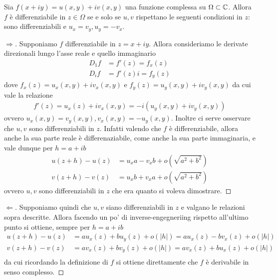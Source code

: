 \begin{theorem}
	Sia $f(x+iy) = u(x,y) + iv(x,y)$ una funzione complessa su $\Omega \subset \mathbb{C}$. Allora $f$ è differenziabile in $z \in \Omega$ se e solo se $u,v$ rispettano le seguenti condizioni in $z$: sono differenziabili e $u_x = v_y, u_y = - v_x$.
\end{theorem}
\begin{proof}[$\Rightarrow$]
	Supponiamo $f$ differenziabile in $z=x+iy$. Allora consideriamo le derivate direzionali lungo l'asse reale e quello immaginario
	\begin{equation}
	\begin{aligned}
		D_{1} f & = f'(z) = f_x(z) \\
		D_{i} f & = f'(z)i = f_y(z)
	\end{aligned}
	\end{equation}
	dove $f_x(z) = u_x(x,y) + iv_x(x,y)$ e $f_y(z) = u_y(x,y) + iv_y(x,y)$ da cui vale la relazione 
	\begin{equation}
	\begin{aligned}
		f'(z) = u_x(z) + iv_x(x,y) = -i(u_y(x,y) + iv_y(x,y))
	\end{aligned}
	\end{equation}	
	ovvero $u_x(x,y) = v_y(x,y), v_x(x,y) = -u_y(x,y)$. Inoltre ci serve osservare che $u,v$ sono differenziabili in $z$. Infatti valendo che $f$ è differenziabile, allora anche la sua parte reale è differenaziabile, come anche la sua parte immaginaria, e vale dunque per $h = a + ib$
	\begin{equation}
	\begin{aligned}
		u(z+h) - u(z) & = u_x a - v_x b + o(\sqrt{a^2 + b^2})\\
		v(z+h) - v(z) & = u_x b + v_x a + o(\sqrt{a^2 + b^2})
	\end{aligned}
	\end{equation}
	ovvero $u,v$ sono differenziabili in $z$ che era quanto si voleva dimostrare. 
\end{proof}
\begin{proof}[$\Leftarrow$]
	Supponiamo quindi che $u,v$ siano differenziabili in $z$ e valgano le relazioni sopra descritte. Allora facendo un po' di inverse-engegneriing rispetto all'ultimo punto si ottiene, sempre per $h = a + ib$
	\begin{equation}
	\begin{aligned}
		u(z+h) - u(z) & = a u_x(z) + b u_y(z) + o(|h|) = a u_x(z) - b v_x(z) + o(|h|) \\
		v(z+h) - v(z) & = a v_x(z) + b v_y(z) + o(|h|) = a v_x(z) + b u_x(z) + o(|h|) \\
		\end{aligned}
	\end{equation}
	da cui ricordando la definizione di $f$ si ottiene direttamente che $f$ è derivabile in senso complesso.
\end{proof}

